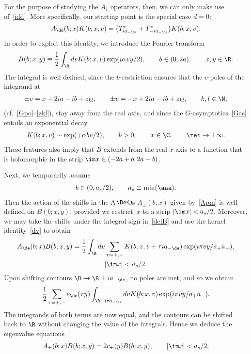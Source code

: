 \documentclass[pdftex]{sigma}
\numberwithin{equation}{section}
\begin{document}
For the purpose of studying the $A_1$ operators, then, we can only make use of~\eqref{idd}. More specif\/ically, our starting point is the special case $d=0$:
\begin{gather}\label{dv}
A_{\de}(b;x)K(b;x,v)= \big(T^v_{ia_{-\de}} +T^v_{-ia_{-\de}} \big)K(b;x,v).
\end{gather}
In order to exploit this identity, we introduce  the Fourier transform
\begin{gather}\label{defB}
B(b;x,y)\equiv \frac{1}{2}\int_{\R}dvK(b;x,v)\exp(i\alpha vy/2),\qquad b\in(0,2a),\qquad x,y\in \R.
\end{gather}
The integral is well def\/ined, since the $b$-restriction ensures that the $v$-poles of the integrand at
\begin{gather}\label{Kpo}
\pm v=x+2ia-ib+z_{kl}, \qquad \pm v=-x+2ia-ib+z_{kl},\qquad k,l\in\N,
\end{gather}
(cf.~\eqref{Gpo}--\eqref{zkl}), stay away from the real axis, and since the $G$-asymptotics~\eqref{Gas} entails an exponential decay
\begin{gather}
K(b;x,v)\sim \exp(\mp \alpha bv/2),\qquad b>0,\qquad x\in\C,\qquad \re v\to\pm\infty.
\end{gather}
These features also imply that $B$ extends from the real $x$-axis to a function that is holomorphic in the strip $\im x\in (-2a+b,2a-b)$.

Next, we temporarily  assume
\begin{gather}
b\in(0,a_s/2),\qquad a_s\equiv\min(\aaa).
\end{gather}
Then the action of the shifts in the A$\De$Os $A_{\pm}(b;x)$ given by~\eqref{Apm} is well def\/ined on $B(b;x,y)$, provided we restrict~$x$ to a strip $|\im x|<a_s/2$. Moreover, we may take the shifts under the integral sign in~\eqref{defB} and use the kernel identity~\eqref{dv} to obtain
\begin{gather}
A_{\de}(b;x)B(b;x,y)=\frac{1}{2}\int_{\R}dv\sum_{\tau=+,-}K(b;x,v+\tau ia_{-\de})\exp(i\pi vy/a_+a_-),\\
 |\im x|<a_s/2.\nonumber
\end{gather}
Upon shifting contours $\R\to \R\pm ia_{-\de}$, no poles are met, and so we obtain
\begin{gather}
\frac12\sum_{\tau=+,-}e_{\de}(\tau y)\int_{\R-i\tau a_{-\de}}dvK(b;x,v)\exp(i\pi vy/a_+a_-).
\end{gather}
The integrands of both terms are now equal, and the contours can be shifted back to $\R$ without changing the value of the integrals. Hence we deduce the eigenvalue equations
\begin{gather}\label{eigen}
A_{\pm}(b;x)B(b;x,y)=2c_{\pm}(y)B(b;x,y),\qquad |\im x|<a_s/2.
\end{gather}
\end{document}
